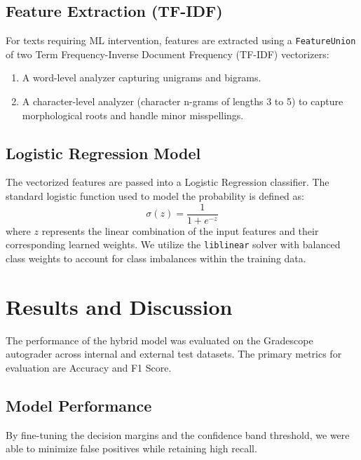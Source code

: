 \documentclass[conference]{IEEEtran}
\begin{document}
\subsection{Feature Extraction (TF-IDF)}
For texts requiring ML intervention, features are extracted using a \texttt{FeatureUnion} of two Term Frequency-Inverse Document Frequency (TF-IDF) vectorizers:
\begin{enumerate}
\item A word-level analyzer capturing unigrams and bigrams.
\item A character-level analyzer (character n-grams of lengths 3 to 5) to capture morphological roots and handle minor misspellings.
\end{enumerate}

\subsection{Logistic Regression Model}
The vectorized features are passed into a Logistic Regression classifier. The standard logistic function used to model the probability is defined as:
\begin{equation}
\sigma(z) = \frac{1}{1 + e^{-z}}\label{eq}
\end{equation}
where $z$ represents the linear combination of the input features and their corresponding learned weights. We utilize the \texttt{liblinear} solver with balanced class weights to account for class imbalances within the training data.

\section{Results and Discussion}\label{ITH}
The performance of the hybrid model was evaluated on the Gradescope autograder across internal and external test datasets. The primary metrics for evaluation are Accuracy and F1 Score.

\subsection{Model Performance}\label{FAT}
By fine-tuning the decision margins and the confidence band threshold, we were able to minimize false positives while retaining high recall. 
\end{document}
